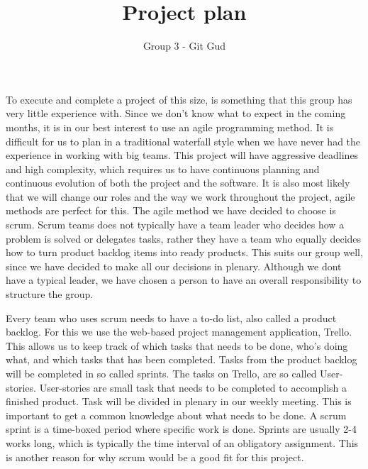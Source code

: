 \documentclass{article}
\begin{document}
\title{Project plan }
\author{Group 3 - Git Gud}

\maketitle


\raggedright

To execute and complete a project of this size, is something that this group has very little experience with. Since we don't know what to expect in the coming months, it is in our best interest to use an agile programming method. It is difficult for us to plan in a traditional waterfall style when we have never had the experience in working with big teams. This project will have aggressive deadlines and high complexity, which requires us to have continuous planning and continuous evolution of both the project and the software. It is also most likely that we will change our roles and the way we work throughout the project, agile methods are perfect for this. \newline
\newline
The agile method we have decided to choose is scrum. Scrum teams does not typically have a team leader who decides how a problem is solved or delegates tasks, rather they have a team who equally decides how to turn product backlog items into ready products. This suits our group well, since we have decided to make all our decisions in plenary. Although we dont have a typical leader, we have chosen a person to have an overall responsibility to structure the group. \newline

Every team who uses scrum needs to have a to-do list, also called a product backlog. For this we use the web-based project management application, Trello. This allows us to keep track of which tasks that needs to be done, who's doing what, and which tasks that has been completed. Tasks from the product backlog will be completed in so called sprints. The tasks on Trello, are so called User-stories. User-stories are small task that needs to be completed to accomplish a finished product. Task will be divided in plenary in our weekly meeting. This is important  to get a common knowledge about what needs to be done. A scrum sprint is a time-boxed period where specific work is done. Sprints are usually 2-4 works long, which is typically the time interval of an obligatory assignment. This is another reason for why scrum would be a good fit for this project. \newline
\end{document}

